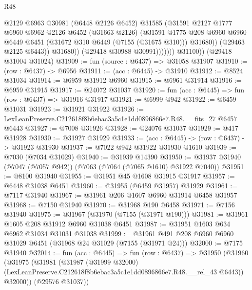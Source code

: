\begin{lexlean}{R48}
\begin{coremodule}
                          @2129
                          @6963
                          @30981
                          (@6448 @2126 @6452)
                          @31585
                          (@31591
                            @2127
                            @1777
                            @6960
                            @6962
                            @2126
                            @6452
                            (@31663 @2126)
                            (@31591
                              @1775
                              @208
                              @6960
                              @6960
                              @6449
                              @6451
                              (@31672 @310 @6449 (@7155 (@31675 @310)))
                              @31680))
                          (@29463 @2125 @6443))
                        @31680))
                    (@29418 @30988 @30991)))))))
        @31100))
    (@29418 @31004 @31024)
@31909 := fun (source : @6437) => @31058 @31907
@31910 := (row : @6437) -> @6956
@31911 := (acc : @6445) -> @31910
@31912 := @8524 @31034
@31914 := @6959 @31912 @6960
@31915 := @6961 @31914
@31916 := @6959 @31915
@31917 := @24072 @31037
@31920 := fun (acc : @6445) => fun (row : @6437) => @31916 @31917
@31921 := @6999 @942
@31922 := @6459 @31031
@31923 := @31921 @31922
@31926 := LexLeanPreserve.C212618f8b6ebac3a5c1e1dd0896866e7.R48.__fits_27 @6457 @6443
@31927 := @7008 @31926
@31928 := @24076 @31037
@31929 := @417 @31928
@31930 := @31927 @31929
@31933 := (acc : @6445) -> (row : @6437) -> @31923 @31930
@31937 := @7022 @942 @31922 @31930 @1610
@31939 := @7030 (@7034 @31029)
@31940 := @31939 @14390
@31950 := @31937 @31940 (@7047 (@7057 @942)) (@7063 (@7064 (@7065 @1610) @31922 @7040))
@31951 := @8100 @31940
@31955 := @31951 @45 @1608 @31915 @31917
@31957 := @6448 @31038 @6451
@31960 := @31955 (@6459 @31957) @31929
@31961 := @7117 @31940
@31967 := @31961 @206 @1607 @6960 @31914 @6458 @31957
@31968 := @7150 @31940
@31970 := @31968 @190 @6458
@31971 := @7156 @31940
@31975 := @31967 (@31970 (@7155 (@31971 @190)))
@31981 := @31961 @1605 @208 @31912 @6960 @31038 @6451
@31987 := @31951 @1603 @634 @6962 @31034 @31031 @31038
@31999 := @31961 @491 @208 @6960 @6960 @31029 @6451 (@31968 @24 @31029 (@7155 (@31971 @24)))
@32000 := @7175 @31940
@32014 := fun (acc : @6445) =>
  fun (row : @6437) =>
  @31950
    (@31960
      (@31975
        (@31981
          (@31987
            (@31999 @32000)
            (LexLeanPreserve.C212618f8b6ebac3a5c1e1dd0896866e7.R48.__rel_43 @6443))
          @32000))
      (@29576 @31037))

\end{coremodule}
\end{lexlean}
